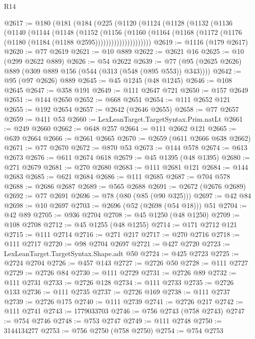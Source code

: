 \begin{lexlean}{R14}
\begin{coremodule}
@2617 := @180
    (@181
      (@184
        (@225
          (@1120
            (@1124
              (@1128
                (@1132
                  (@1136
                    (@1140
                      (@1144
                        (@1148
                          (@1152
                            (@1156
                              (@1160
                                (@1164
                                  (@1168
                                    (@1172 (@1176 (@1180 (@1184 (@1188 @2595)))))))))))))))))))))
@2619 := @1116 (@179 @2617)
@2620 := @77 @2619
@2621 := @10 @889
@2622 := @2621 @16
@2625 := @10 (@299 @2622 @889)
@2626 := @54 @2622
@2639 := @77 (@95 (@2625 @2626) @889 (@309 @889 @156 (@544 (@313 (@548 (@895 @553)) @343))))
@2642 := @95 (@97 @2626) @889
@2645 := @45 @1245 (@48 @1245)
@2646 := @108 @2645
@2647 := @358 @191
@2649 := @111 @2647 @721
@2650 := @157 @2649
@2651 := @144 @2650
@2652 := @668 @2651
@2654 := @111 @2652 @121
@2655 := @192 @2654
@2657 := @2642 (@2646 @2655)
@2658 := @77 @2657
@2659 := @411 @53
@2660 := LexLeanTarget.TargetSyntax.Prim.natLt
@2661 := @249 @2660
@2662 := @648 @257
@2664 := @111 @2662 @121
@2665 := @639 @2664
@2666 := @2661 @2665
@2670 := @2659 (@611 @2666 @638 @2662)
@2671 := @77 @2670
@2672 := @870 @53
@2673 := @144 @578
@2674 := @613 @2673
@2676 := @611 @2674 @618
@2679 := @45 @1395 (@48 @1395)
@2680 := @271 @2679
@2681 := @270 @2680
@2683 := @111 @2681 @121
@2684 := @144 @2683
@2685 := @621 @2684
@2686 := @111 @2685
@2687 := @704 @578
@2688 := @2686 @2687
@2689 := @565 @2688
@2691 := @2672 (@2676 @2689)
@2692 := @77 @2691
@2696 := @78 (@80 (@85 (@90 @325)))
@2697 := @42 @84
@2698 := @10 @2697
@2703 := @2696 (@52 (@2698 (@54 @18))) @51
@2704 := @42 @89
@2705 := @936 @2704
@2708 := @45 @1250 (@48 @1250)
@2709 := @108 @2708
@2712 := @45 @1255 (@48 @1255)
@2714 := @171 @2712 @121
@2715 := @111 @2714
@2716 := @271 @217
@2717 := @270 @2716
@2718 := @111 @2717
@2720 := @98 @2704 @2697
@2721 := @427 @2720
@2723 := LexLeanTarget.TargetSyntax.Shape.adt @50
@2724 := @425 @2723
@2725 := @2724 @2704
@2726 := @457 @143
@2727 := @2726 @50
@2728 := @111 @2727
@2729 := @2726 @84
@2730 := @111 @2729
@2731 := @2726 @89
@2732 := @111 @2731
@2733 := @2726 @128
@2734 := @111 @2733
@2735 := @2726 @133
@2736 := @111 @2735
@2737 := @2726 @169
@2738 := @111 @2737
@2739 := @2726 @175
@2740 := @111 @2739
@2741 := @2726 @217
@2742 := @111 @2741
@2743 := 1779033703
@2746 := @756 @2743 (@758 @2743)
@2747 := @754 @2746
@2748 := @753 @2747
@2749 := @111 @2748
@2750 := 3144134277
@2753 := @756 @2750 (@758 @2750)
@2754 := @754 @2753

\end{coremodule}
\end{lexlean}
